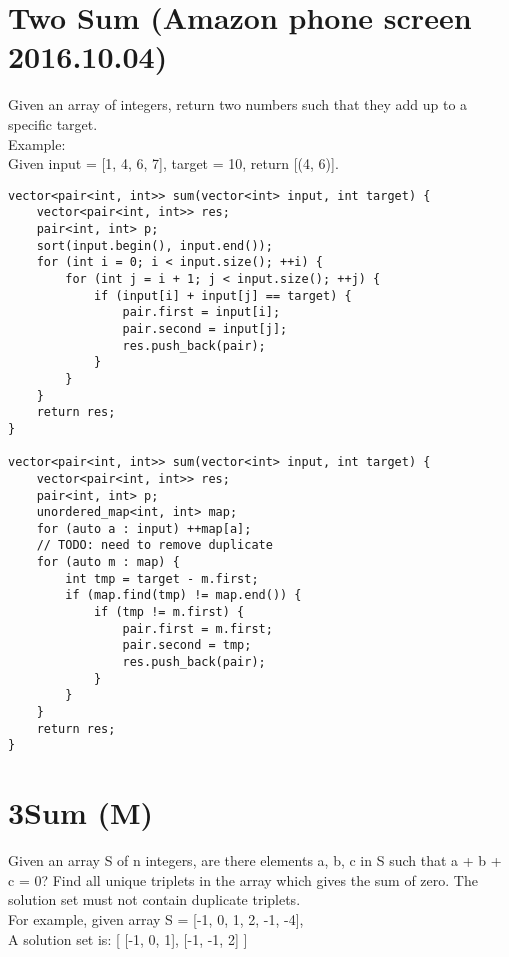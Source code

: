 \section{Two Sum (Amazon phone screen 2016.10.04)}
Given an array of integers, return two numbers such that they add up to a specific target. \\

Example:\\
Given input = [1, 4, 6, 7], target = 10, return [(4, 6)]. \\

\begin{lstlisting}
vector<pair<int, int>> sum(vector<int> input, int target) {
    vector<pair<int, int>> res;
    pair<int, int> p;
    sort(input.begin(), input.end());
    for (int i = 0; i < input.size(); ++i) {
        for (int j = i + 1; j < input.size(); ++j) {
            if (input[i] + input[j] == target) {
                pair.first = input[i];
                pair.second = input[j];
                res.push_back(pair);
            }
        }
    }
    return res;
}

vector<pair<int, int>> sum(vector<int> input, int target) {
    vector<pair<int, int>> res;
    pair<int, int> p;
    unordered_map<int, int> map;
    for (auto a : input) ++map[a];
    // TODO: need to remove duplicate
    for (auto m : map) {
        int tmp = target - m.first;
        if (map.find(tmp) != map.end()) {
            if (tmp != m.first) {
                pair.first = m.first;
                pair.second = tmp;
                res.push_back(pair);
            }
        }
    }
    return res;
}
\end{lstlisting}

\section{3Sum (M)}
Given an array S of n integers, are there elements a, b, c in S such that a + b + c = 0? Find all unique triplets in the array which gives the sum of zero. The solution set must not contain duplicate triplets.\\

For example, given array S = [-1, 0, 1, 2, -1, -4], \\
A solution set is:
[
  [-1, 0, 1],
  [-1, -1, 2]
] \\

